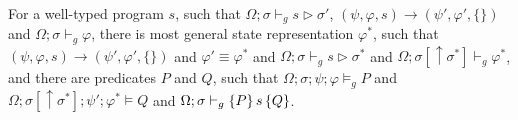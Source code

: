 \begin{theorem}\label{thm:proof-completeness}\rm 
For a well-typed program $s$, such that $\Omega;\sigma\vdash_g s \triangleright \sigma'$, $(\psi,\varphi,s)\longrightarrow (\psi',\varphi',\{\})$ and $\Omega;\sigma\vdash_g \varphi$, there is most general state representation $\varphi^*$, such that $(\psi,\varphi,s)\longrightarrow (\psi',\varphi',\{\})$ and $\varphi' \equiv \varphi^*$ and $\Omega;\sigma\vdash_g s \triangleright \sigma^*$ and $\Omega;\sigma[\uparrow \sigma^*]\vdash_g \varphi^*$, and there are predicates $P$ and $Q$, such that $\Omega;\sigma;\psi;\varphi\models_g P$ and $\Omega;\sigma[\uparrow\sigma^*];\psi';\varphi^* \models Q$ and $\Omega;\sigma\vdash_{g}\{P\}\, s \,\{Q\}$.
\end{theorem}





